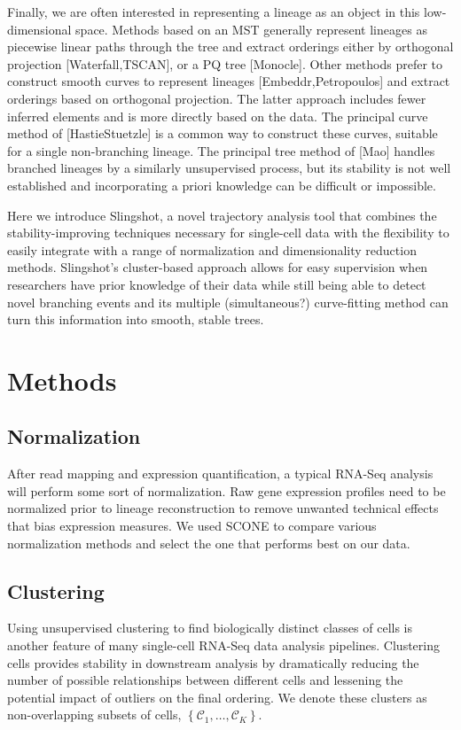 \documentclass[11pt]{article}\usepackage[]{graphicx}\usepackage[]{color}
\begin{document}
Finally, we are often interested in representing a lineage as an object in this low-dimensional space. Methods based on an MST generally represent lineages as piecewise linear paths through the tree and extract orderings either by orthogonal projection [Waterfall,TSCAN], or a PQ tree [Monocle]. Other methods prefer to construct smooth curves to represent lineages [Embeddr,Petropoulos] and extract orderings based on orthogonal projection. The latter approach includes fewer inferred elements and is more directly based on the data. The principal curve method of [HastieStuetzle] is a common way to construct these curves, suitable for a single non-branching lineage. The principal tree method of [Mao] handles branched lineages by a similarly unsupervised process, but its stability is not well established and incorporating a priori knowledge can be difficult or impossible.

Here we introduce Slingshot, a novel trajectory analysis tool that combines the stability-improving techniques necessary for single-cell data with the flexibility to easily integrate with a range of normalization and dimensionality reduction methods. Slingshot's cluster-based approach allows for easy supervision when researchers have prior knowledge of their data while still being able to detect novel branching events and its multiple (simultaneous?) curve-fitting method can turn this information into smooth, stable trees.

\section{Methods}

\subsection{Normalization}
After read mapping and expression quantification, a typical RNA-Seq analysis will perform some sort of normalization. Raw gene expression profiles need to be normalized prior to lineage reconstruction to remove unwanted technical effects that bias expression measures. We used SCONE to compare various normalization methods and select the one that performs best on our data.

\subsection{Clustering}
Using unsupervised clustering to find biologically distinct classes of cells is another feature of many single-cell RNA-Seq data analysis pipelines. Clustering cells provides stability in downstream analysis by dramatically reducing the number of possible relationships between different cells and lessening the potential impact of outliers on the final ordering. We denote these clusters as non-overlapping subsets of cells, $\left\{\mathcal{C}_1,\dots,\mathcal{C}_K\right\}$.
\end{document}
